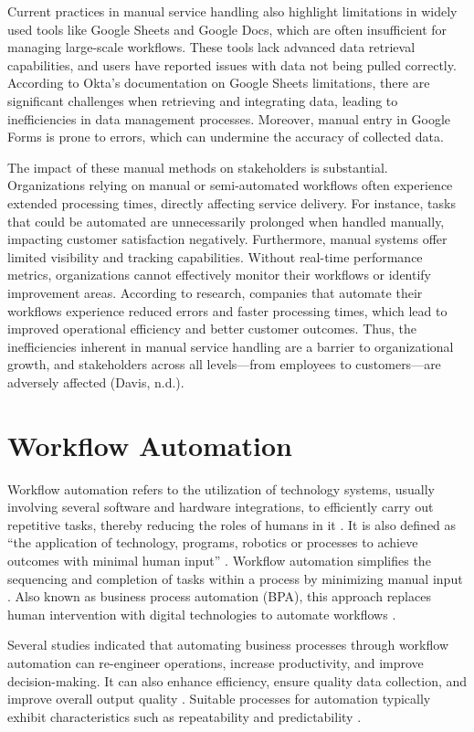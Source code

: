 Current practices in manual service handling also highlight limitations in widely used tools like Google Sheets and Google Docs, which are often insufficient for managing large-scale workflows. These tools lack advanced data retrieval capabilities, and users have reported issues with data not being pulled correctly. According to Okta’s documentation on Google Sheets limitations, there are significant challenges when retrieving and integrating data, leading to inefficiencies in data management processes. Moreover, manual entry in Google Forms is prone to errors, which can undermine the accuracy of collected data.

The impact of these manual methods on stakeholders is substantial. Organizations relying on manual or semi-automated workflows often experience extended processing times, directly affecting service delivery. For instance, tasks that could be automated are unnecessarily prolonged when handled manually, impacting customer satisfaction negatively. Furthermore, manual systems offer limited visibility and tracking capabilities. Without real-time performance metrics, organizations cannot effectively monitor their workflows or identify improvement areas. According to research, companies that automate their workflows experience reduced errors and faster processing times, which lead to improved operational efficiency and better customer outcomes. Thus, the inefficiencies inherent in manual service handling are a barrier to organizational growth, and stakeholders across all levels—from employees to customers—are adversely affected (Davis, n.d.).

\section{Workflow Automation}

Workflow automation refers to the utilization of technology systems, usually involving several software and hardware integrations, to efficiently carry out repetitive tasks, thereby reducing the roles of humans in it \cite{winarko2021}. It is also defined as “the application of technology, programs, robotics or processes to achieve outcomes with minimal human input” \cite{ibm}. Workflow automation simplifies the sequencing and completion of tasks within a process by minimizing manual input  \cite{astera2024}. Also known as business process automation (BPA), this approach replaces human intervention with digital technologies to automate workflows \cite{thomas2024}.  

Several studies indicated that automating business processes through workflow automation can re-engineer operations, increase productivity, and improve decision-making\cite{abecker2000, aversano2002}. It can also enhance efficiency, ensure quality data collection, and improve overall output quality \cite{pakdil2009}. Suitable processes for automation typically exhibit characteristics such as repeatability and predictability \cite{basu2002}. 

